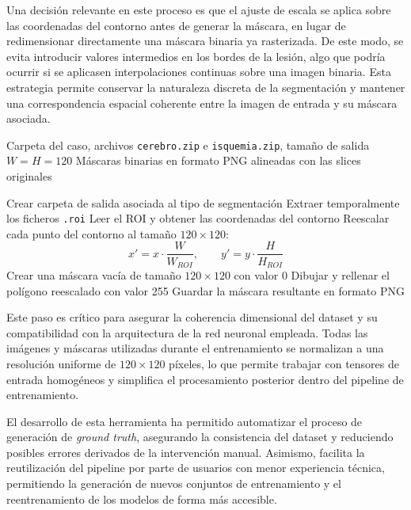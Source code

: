 Una decisión relevante en este proceso es que el ajuste de escala se aplica sobre las coordenadas del contorno antes de generar la máscara, en lugar de redimensionar directamente una máscara binaria ya rasterizada. De este modo, se evita introducir valores intermedios en los bordes de la lesión, algo que podría ocurrir si se aplicasen interpolaciones continuas sobre una imagen binaria. Esta estrategia permite conservar la naturaleza discreta de la segmentación y mantener una correspondencia espacial coherente entre la imagen de entrada y su máscara asociada.

\begin{algorithm}[h]
\caption{Generación de máscaras binarias a partir de anotaciones ROI}
\label{alg:generacion_mascaras}
\begin{algorithmic}[1]
\Require Carpeta del caso, archivos \texttt{cerebro.zip} e \texttt{isquemia.zip}, tamaño de salida \(W = H = 120\)
\Ensure Máscaras binarias en formato PNG alineadas con las slices originales

    \State Crear carpeta de salida asociada al tipo de segmentación
    \State Extraer temporalmente los ficheros \texttt{.roi}
        \State Leer el ROI y obtener las coordenadas del contorno
        \State Reescalar cada punto del contorno al tamaño \(120 \times 120\):
        \[
            x' = x \cdot \frac{W}{W_{ROI}}, \qquad
            y' = y \cdot \frac{H}{H_{ROI}}
        \]
        \State Crear una máscara vacía de tamaño \(120 \times 120\) con valor 0
        \State Dibujar y rellenar el polígono reescalado con valor 255
        \State Guardar la máscara resultante en formato PNG
    \EndFor
\EndFor
\end{algorithmic}
\end{algorithm}

Este paso es crítico para asegurar la coherencia dimensional del dataset y su compatibilidad con la arquitectura de la red neuronal empleada. Todas las imágenes y máscaras utilizadas durante el entrenamiento se normalizan a una resolución uniforme de \(120 \times 120\) píxeles, lo que permite trabajar con tensores de entrada homogéneos y simplifica el procesamiento posterior dentro del pipeline de entrenamiento.

El desarrollo de esta herramienta ha permitido automatizar el proceso de generación de \textit{ground truth}, asegurando la consistencia del dataset y reduciendo posibles errores derivados de la intervención manual. Asimismo, facilita la reutilización del pipeline por parte de usuarios con menor experiencia técnica, permitiendo la generación de nuevos conjuntos de entrenamiento y el reentrenamiento de los modelos de forma más accesible.

